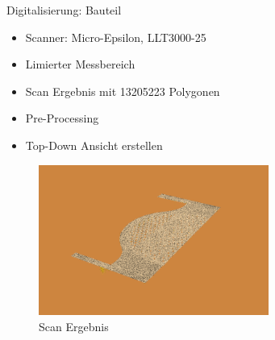 \documentclass[../slides.tex]{subfiles}
\begin{document}
\begin{frame}{Digitalisierung: Bauteil}
    \begin{minipage}[]{.39\textwidth}
      \begin{itemize}
        \item Scanner: Micro-Epsilon, LLT3000-25
        \item Limierter Messbereich
        \item Scan Ergebnis mit 13205223 Polygonen
        \item Pre-Processing
        \item Top-Down Ansicht erstellen
      \end{itemize}
    \end{minipage}
    \hfill
    \begin{minipage}[]{.6\textwidth}
      \begin{figure}[]
        \includegraphics[height=140pt]{img_niklas/base_scan.png}
        \caption{Scan Ergebnis}
        \label{fig:base_scan}
      \end{figure}
    \end{minipage}
  \end{frame}
\end{document}
